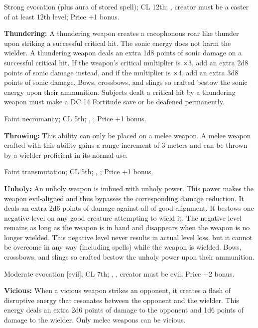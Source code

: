 Strong evocation (plus aura of stored spell); CL 12th; , creator must be a caster of at least 12th level; Price +1 bonus.


\textbf{Thundering:} A thundering weapon creates a cacophonous roar like thunder upon striking a successful critical hit. The sonic energy does not harm the wielder. A thundering weapon deals an extra 1d8 points of sonic damage on a successful critical hit. If the weapon's critical multiplier is $\times3$, add an extra 2d8 points of sonic damage instead, and if the multiplier is $\times4$, add an extra 3d8 points of sonic damage. Bows, crossbows, and slings so crafted bestow the sonic energy upon their ammunition. Subjects dealt a critical hit by a thundering weapon must make a DC 14 Fortitude save or be deafened permanently.

Faint necromancy; CL 5th; , ; Price +1 bonus.


\textbf{Throwing:} This ability can only be placed on a melee weapon. A melee weapon crafted with this ability gains a range increment of 3 meters and can be thrown by a wielder proficient in its normal use.

Faint transmutation; CL 5th; , ; Price +1 bonus.


\textbf{Unholy:} An unholy weapon is imbued with unholy power. This power makes the weapon evil-aligned and thus bypasses the corresponding damage reduction. It deals an extra 2d6 points of damage against all of good alignment. It bestows one negative level on any good creature attempting to wield it. The negative level remains as long as the weapon is in hand and disappears when the weapon is no longer wielded. This negative level never results in actual level loss, but it cannot be overcome in any way (including  spells) while the weapon is wielded. Bows, crossbows, and slings so crafted bestow the unholy power upon their ammunition.

Moderate evocation [evil]; CL 7th; , , creator must be evil; Price +2 bonus.


\textbf{Vicious:} When a vicious weapon strikes an opponent, it creates a flash of disruptive energy that resonates between the opponent and the wielder. This energy deals an extra 2d6 points of damage to the opponent and 1d6 points of damage to the wielder. Only melee weapons can be vicious.

